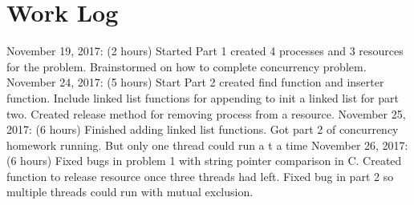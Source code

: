 \documentclass{article}
\begin{document}
\section*{Work Log}
November 19, 2017: (2 hours) Started Part 1 created 4 processes and 3 resources for the problem. Brainstormed on how to complete concurrency problem.
November 24, 2017: (5 hours) Start Part 2 created find function and inserter function. Include linked list functions for appending to init a linked list for part two. Created release method for removing process from a resource.
November 25, 2017: (6 hours) Finished adding linked list functions. Got part 2 of concurrency homework running. But only one thread could run a t a time
November 26, 2017: (6 hours) Fixed bugs in problem 1 with string pointer comparison in C. Created function to release resource once three threads had left. Fixed bug in part 2 so multiple threads could run with mutual exclusion. 
\end{document}
